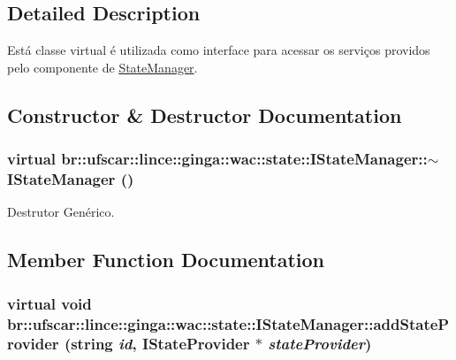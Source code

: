 \subsection{Detailed Description}
Está classe virtual é utilizada como interface para acessar os serviços providos pelo componente de \hyperlink{classbr_1_1ufscar_1_1lince_1_1ginga_1_1wac_1_1state_1_1StateManager}{StateManager}. 

\subsection{Constructor \& Destructor Documentation}
\hypertarget{classbr_1_1ufscar_1_1lince_1_1ginga_1_1wac_1_1state_1_1IStateManager_afde1134f339b28a3a262f3df65857cc1}{
\subsubsection[{$\sim$IStateManager}]{\setlength{\rightskip}{0pt plus 5cm}virtual br::ufscar::lince::ginga::wac::state::IStateManager::$\sim$IStateManager ()}}
\label{classbr_1_1ufscar_1_1lince_1_1ginga_1_1wac_1_1state_1_1IStateManager_afde1134f339b28a3a262f3df65857cc1}


Destrutor Genérico. 



\subsection{Member Function Documentation}
\hypertarget{classbr_1_1ufscar_1_1lince_1_1ginga_1_1wac_1_1state_1_1IStateManager_a739db8ceb6f56a110aa46bd272ea0956}{
\subsubsection[{addStateProvider}]{\setlength{\rightskip}{0pt plus 5cm}virtual void br::ufscar::lince::ginga::wac::state::IStateManager::addStateProvider (string {\em id}, \/  {\bf IStateProvider} $\ast$ {\em stateProvider})}}
\label{classbr_1_1ufscar_1_1lince_1_1ginga_1_1wac_1_1state_1_1IStateManager_a739db8ceb6f56a110aa46bd272ea0956}


